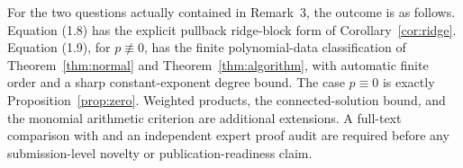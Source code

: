 \documentclass[11pt]{article}
\numberwithin{equation}{section}
\theoremstyle{definition}\newtheorem{definition}[theorem]{Definition}
\theoremstyle{remark}\newtheorem{remark}[theorem]{Remark}
\begin{document}
For the two questions actually contained in Remark~3, the outcome is as
follows. Equation (1.8) has the explicit pullback ridge-block form of
Corollary~\ref{cor:ridge}. Equation (1.9), for $p\not\equiv0$, has the
finite polynomial-data classification of Theorem~\ref{thm:normal} and
Theorem~\ref{thm:algorithm}, with automatic finite order and a sharp
constant-exponent degree bound. The case $p\equiv0$ is exactly
Proposition~\ref{prop:zero}. Weighted products, the connected-solution
bound, and the monomial arithmetic criterion are additional extensions.
A full-text comparison with \cite{XuDing2026} and an independent expert
proof audit are required before any submission-level novelty or
publication-readiness claim.


\end{document}
